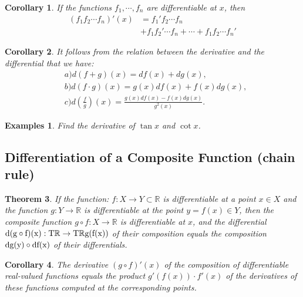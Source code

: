 \documentclass[a4paper,12pt]{article} %
\newtheorem{theorem}{Theorem}[section]
\newtheorem{corollary}[theorem]{Corollary}
\newtheorem{example}{Examples}
\begin{document}
\begin{corollary}
    If the functions $f_1, \cdots, f_n$ are differentiable at $x$, then 
    \[
        \begin{split}
            \left(f_1f_2\cdots f_n\right)'(x) &= f_1'f_2\cdots f_n \\
            & + f_1f_2'\cdots f_n  + \cdots + f_1f_2\cdots f_n'
        \end{split}
        \]
\end{corollary}

\begin{corollary}
    It follows from the relation between the derivative and the 
    differential that we have:
    \[
        \begin{split}
            & a) d(f+g)(x) = df(x) + dg(x),\\
            & b) d(f\cdot g)(x) = g(x)df(x) + f(x)dg(x),\\
            & c) d\left(\frac{f}{g}\right)(x) = \frac{g(x)df(x) - f(x)dg(x)}{g^2(x)}.
        \end{split}
        \]
\end{corollary}

\begin{example}
    Find the derivative of $\displaystyle \tan x$ and 
    $\cot x$.
\end{example}

\subsection{Differentiation of a Composite Function (chain rule)}
\begin{theorem}
    If the function: $f: X \to Y \subset \mathbb{R}$  is differentiable 
    at a point $x \in X$ and the function $g: Y \to \mathbb{R}$
    is differentiable at the point $y = f(x) \in Y$, then the composite 
    function $g \circ f: X \to \mathbb{R}$ is differentiable at $x$, and the 
    differential $\rm{d} (g \circ f)(x): T\mathbb{R} \to T\mathbb{R}g(f(x))$
    of their composition equals the composition $\rm{d}g(y) \circ \rm{d}f(x)$ of 
    their differentials.
\end{theorem}

\begin{corollary}
    The derivative $(g \circ f)'(x)$ of the composition of differentiable 
    real-valued functions equals the product $g'(f(x)) \cdot f'(x)$ of the derivatives 
    of these functions computed at the corresponding points.
\end{corollary}
\end{document}

